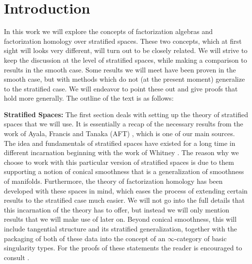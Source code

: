 \documentclass[../text]{subfiles}
\begin{document}
\section{Introduction}

In this work we will explore the concepts of factorization algebras and factorization homology over stratified spaces. These two concepts, which at first sight will looks very different, will turn out to be closely related. We will strive to keep the discussion at the level of stratified spaces, while making a comparison to results in the smooth case. Some results we will meet have been proven in the smooth case, but with methods which do not (at the present moment) generalize to the stratified case. We will endeavor to point these out and give proofs that hold more generally. The outline of the text is as follows:

\textbf{ Stratified Spaces:} The first section deals with setting up the theory of stratified spaces that we will use. It is essentially a recap of the necessary results from the work of Ayala, Francis and Tanaka (AFT) \cite{aft_localstrut}, which is one of our main sources. The idea and fundamentals of stratified spaces have existed for a long time in different incarnation beginning with the work of Whitney \cite{whitney92}. The reason why we choose to work with this particular version of stratified spaces is due to them supporting a notion of conical smoothness that is a generalization of smoothness of manifolds. Furthermore, the theory of factorization homology has been developed with these spaces in mind, which eases the process of extending certain results to the stratified case much easier. We will not go into the full details that this incarnation of the theory has to offer, but instead we will only mention results that we will make use of later on. Beyond conical smoothness, this will include tangential structure and its stratified generalization, together with the packaging of both of these data into the concept of an $\infty$-category of basic singularity types. For the proofs of these statements the reader is encouraged to consult \cite{aft_localstrut}.
\end{document}
